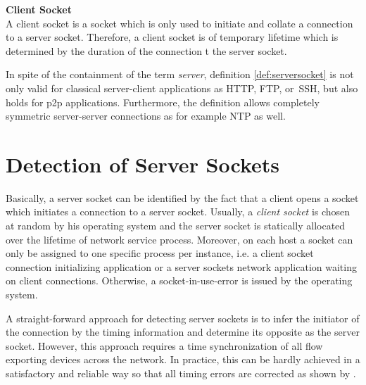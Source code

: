 \parbox{ 
\textwidth}{ 
\begin{defn}
	{\textbf{Client Socket}\\} A client socket is a socket which is only used to 
	initiate and collate a connection to a server socket. Therefore, a client 
	socket is of temporary lifetime which is determined by the duration of the 
	connection t the server socket. 
\end{defn}
}

In spite of the containment of the term \emph{server}, definition 
\ref{def:serversocket} is not only valid for classical server-client 
applications as \gls{HTTP}, \gls{FTP}, or \gls{SSH}, but also holds for 
\gls{p2p} applications. Furthermore, the definition allows completely symmetric 
server-server connections as for example \gls{NTP} as well. 


\section{Detection of Server Sockets 
\label{section:socket_detection}}

Basically, a \gls{server socket} can be identified by the fact that a client 
opens a socket which initiates a connection to a \gls{server socket}. Usually, 
a \emph{client socket} is chosen at random by his operating system and the 
\gls{server socket} is statically allocated over the lifetime of network 
service process. Moreover, on each host a socket can only be assigned to one 
specific process per instance, i.e. a client socket connection initializing 
application or a \glspl{server socket} network application waiting on client 
connections. Otherwise, a socket-in-use-error is issued by the operating 
system\citep{Schatzmann:Dissection}.

A straight-forward approach for detecting \glspl{server socket} is to infer the 
initiator of the connection by the timing information and determine its opposite 
as the \gls{server socket}. However, this approach requires a time 
synchronization of all flow exporting devices across the network. In practice, 
this can be hardly achieved in a satisfactory and reliable way so that all 
timing errors are corrected as shown by \citet{Trammell}.

